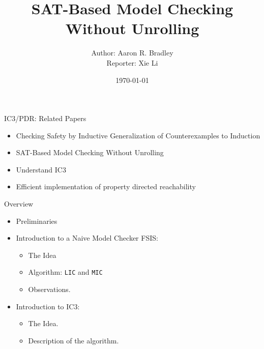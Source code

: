 \documentclass[aspectratio=1610, 13pt]{beamer}
\title{SAT-Based Model Checking Without Unrolling}
\author{Author: Aaron R. Bradley\\
Reporter:  Xie Li}
\date{\today}
\begin{document}
\maketitle
\begin{frame}{IC3/PDR: Related Papers}
\begin{itemize}
\item Checking Safety by Inductive Generalization of
Counterexamples to Induction
\item SAT-Based Model Checking Without Unrolling
\item Understand IC3
\item Efficient implementation of property directed reachability
\end{itemize}
\end{frame}

\begin{frame}{Overview}
\begin{itemize}
\item Preliminaries
\item Introduction to a Naive Model Checker FSIS:
	\begin{itemize}
	\item The Idea
	\item Algorithm: \texttt{LIC} and \texttt{MIC}
	\item Observations.
	\end{itemize}
\item Introduction to IC3:
\begin{itemize}
\item The Idea.
\item Description of the algorithm.
\end{itemize}
\end{itemize}
\end{frame}
\end{document}
